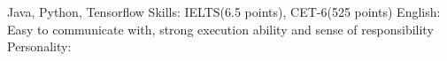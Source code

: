 \begin{cvhonors}
  \cvhonor
    {Java, Python, Tensorflow}
    {}
    {}
    {Skills:}
  \cvhonor
    {IELTS(6.5 points),  CET-6(525 points)}
    {}
    {}
    {English:}
  \cvhonor
    {Easy to communicate with, strong execution ability and sense of responsibility}
    {}
    {}
    {Personality: }
\end{cvhonors}
